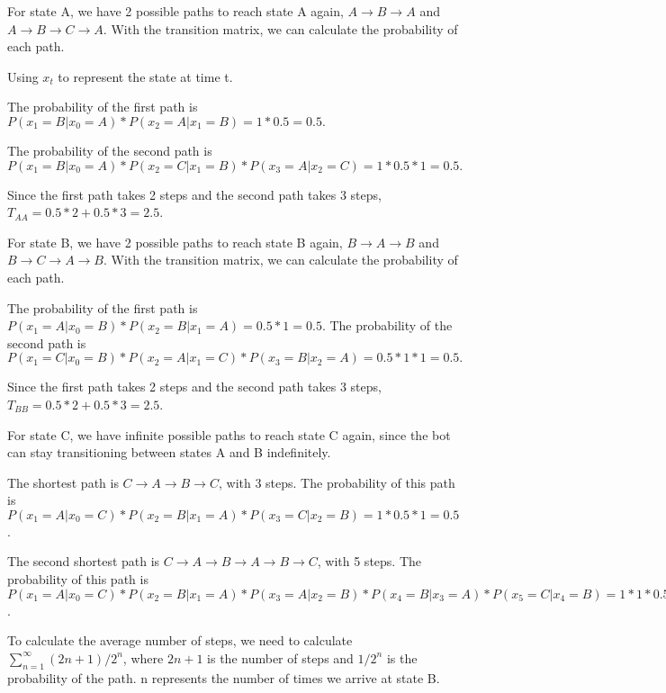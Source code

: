 \documentclass{article}
\begin{document}
For state A, we have 2 possible paths to reach state A again, $A \rightarrow B \rightarrow A$ and 
$A \rightarrow B \rightarrow C \rightarrow A$. With the transition matrix, we can calculate the probability of each path.

\bigskip

Using $x_t$ to represent the state at time t. 

The probability of the first path is $P(x_1=B|x_0=A) * P(x_2=A|x_1=B) = 1 * 0.5 = 0.5.$

The probability of the second path is $P(x_1=B|x_0=A) * P(x_2=C|x_1=B) * P(x_3=A|x_2=C) = 1 * 0.5 * 1 = 0.5.$


Since the first path takes 2 steps and the second path takes 3 steps, 
$T_{AA} = 0.5 * 2 + 0.5 * 3 = 2.5$.

\bigskip

For state B, we have 2 possible paths to reach state B again, $B \rightarrow A \rightarrow B$ and
$B \rightarrow C \rightarrow A \rightarrow B$. With the transition matrix, we can calculate the probability of each path.

The probability of the first path is $P(x_1=A|x_0=B) * P(x_2=B|x_1=A) = 0.5 * 1 = 0.5.$
The probability of the second path is $P(x_1=C|x_0=B) * P(x_2=A|x_1=C) * P(x_3=B|x_2=A) = 0.5 * 1 * 1 = 0.5.$

Since the first path takes 2 steps and the second path takes 3 steps,
$T_{BB} = 0.5 * 2 + 0.5 * 3 = 2.5$.

\bigskip

For state C, we have infinite possible paths to reach state C again, since the bot can stay transitioning between states A and B indefinitely.

The shortest path is $C \rightarrow A \rightarrow B \rightarrow C$, with 3 steps.
The probability of this path is $P(x_1=A|x_0=C) * P(x_2=B|x_1=A) * P(x_3=C|x_2=B) = 1 * 0.5 * 1 = 0.5$.

The second shortest path is $C \rightarrow A \rightarrow B \rightarrow A \rightarrow B \rightarrow C$, with 5 steps.
The probability of this path is $P(x_1=A|x_0=C) * P(x_2=B|x_1=A) * P(x_3=A|x_2=B) * P(x_4=B|x_3=A) * P(x_5=C|x_4=B) 
= 1 * 1 * 0.5 * 1 * 0.5 = 0.25$.


To calculate the average number of steps, we need to calculate $\sum_{n=1}^{\infty} (2n + 1) / 2^n$, 
where $2n + 1$ is the number of steps and $1/2^n$ is the probability of the path. n represents the number of times we arrive at 
state B.

\bigskip
\end{document}
